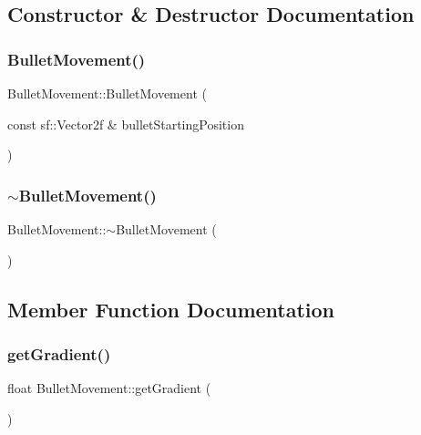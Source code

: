 \subsection{Constructor \& Destructor Documentation}
\mbox{\label{class_bullet_movement_a828d99972323657caf3dafa00e3a9e5e}} 
\subsubsection{\texorpdfstring{Bullet\+Movement()}{BulletMovement()}}
{\footnotesize\ttfamily Bullet\+Movement\+::\+Bullet\+Movement (\begin{DoxyParamCaption}\item[{const sf\+::\+Vector2f \&}]{bullet\+Starting\+Position }\end{DoxyParamCaption})}

\mbox{\label{class_bullet_movement_a81e3816f8089dd796ed1ac03a3d9c683}} 
\subsubsection{\texorpdfstring{$\sim$\+Bullet\+Movement()}{~BulletMovement()}}
{\footnotesize\ttfamily Bullet\+Movement\+::$\sim$\+Bullet\+Movement (\begin{DoxyParamCaption}{ }\end{DoxyParamCaption})\hspace{0.3cm}{\ttfamily [virtual]}}



\subsection{Member Function Documentation}
\mbox{\label{class_bullet_movement_a4dddd135a0d89dbb8d7b4ec076264f16}} 
\subsubsection{\texorpdfstring{get\+Gradient()}{getGradient()}}
{\footnotesize\ttfamily float Bullet\+Movement\+::get\+Gradient (\begin{DoxyParamCaption}{ }\end{DoxyParamCaption})\hspace{0.3cm}{\ttfamily [inline]}}

